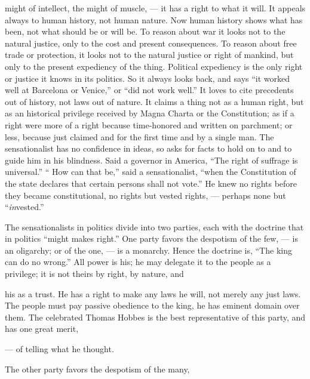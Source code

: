 \documentclass[12pt]{article}
\begin{document}

might of intellect, the might of muscle, --- it has a 
right to what it will. It appeals always to human history, not human nature. Now human history shows 
what has been, not what should be or will be. To reason about war it looks not to the natural justice, only 
to the cost and present consequences. To reason about 
free trade or protection, it looks not to the natural 
justice or right of mankind, but only to the present 
expediency of the thing. Political expediency is the 
only right or justice it knows in its politics. So it 
always looks back, and says ``it worked well at Barcelona or Venice,'' or ``did not work well.'' It loves to 
cite precedents out of history, not laws out of nature. 
It claims a thing not as a human right, but as an historical privilege received by Magna Charta or the 
Constitution; as if a right were more of a right because time-honored and written on parchment; or 
less, because just claimed and for the first time and by 
a single man. The sensationalist has no confidence in 
ideas, so asks for facts to hold on to and to guide him 
in his blindness. Said a governor in America, ``The 
right of suffrage is universal.'' `` How can that be,'' 
said a sensationalist, ``when the Constitution of the 
state declares that certain persons shall not vote.'' 
He knew no rights before they became constitutional, 
no rights but vested rights, --- perhaps none but ``\emph{in}vested.''

The sensationalists in politics divide into two parties, 
each with the doctrine that in politics ``might makes 
right.'' One party favors the despotism of the few, --- 
is an oligarchy; or of the one, --- is a monarchy. 
Hence the doctrine is, ``The king can do no wrong.'' 
All power is his; he may delegate it to the people as 
a privilege; it is not theirs by right, by nature, and 




his as a trust. He has a right to make any laws he 
will, not merely any just laws. The people must pay 
passive obedience to the king, he has eminent domain 
over them. The celebrated Thomas Hobbes is the best 
representative of this party, and has one great merit, 

--- of telling what he thought. 

The other party favors the despotism of the many, 
\end{document}
